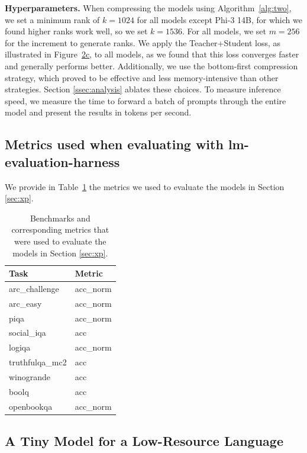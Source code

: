 \documentclass[11pt]{article}
\newcommand{\myparagraph}[1]{\noindent\textbf{#1}}
\begin{document}
\myparagraph{Hyperparameters.} When compressing the models using Algorithm~\ref{alg:two}, we set a minimum rank of $k=1024$ for all models except Phi-3 14B, for which we found higher ranks work well, so we set $k=1536$. For all models, we set $m=256$ for the increment to generate ranks.
We apply the Teacher+Student loss, as illustrated in Figure~\hyperref[fig:teacher_student]{2c}, to all models, as we found that this loss converges faster and generally performs better. Additionally, we use the bottom-first compression strategy, which proved to be effective and less memory-intensive than other strategies. Section \ref{ssec:analysis} ablates these choices. To measure inference speed, we measure the time to forward a batch of prompts
through the entire model and present the results in tokens per second.

\subsection{Metrics used when evaluating with lm-evaluation-harness}
We provide in Table~\ref{tab:task_metric_map} the metrics we used to evaluate the models in Section \ref{sec:xp}.
\begin{table}[!ht]
\centering
    \begin{tabular}{ll}
    \toprule
    \textbf{Task} & \textbf{Metric} \\ 
    \midrule
    arc\_challenge   & acc\_norm \\ 
    arc\_easy        & acc\_norm \\ 
    piqa             & acc\_norm \\ 
    social\_iqa      & acc \\ 
    logiqa           & acc\_norm \\ 
    truthfulqa\_mc2  & acc \\ 
    winogrande       & acc \\ 
    boolq            & acc \\ 
    openbookqa       & acc\_norm \\ 
    \bottomrule
    \end{tabular}
\caption{Benchmarks and corresponding metrics that were used to evaluate the models in Section \ref{sec:xp}.}
\label{tab:task_metric_map}
\end{table}

\subsection{A Tiny Model for a Low-Resource Language}
\label{sec:hausa}
\end{document}
